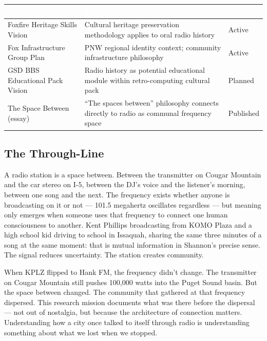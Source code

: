 \documentclass[11pt,letterpaper]{article}
\newcommand{\tableheader}[1]{\textbf{\sffamily\textcolor{white}{#1}}}
\begin{document}
\begin{center}
\begin{tabularx}{\textwidth}{L{4cm}XC{2.5cm}}
\toprule
{}
\tableheader{Document} & \tableheader{Relationship} & \tableheader{Status} \\
\midrule
Foxfire Heritage Skills Vision & Cultural heritage preservation methodology applies to oral radio history & Active \\
Fox Infrastructure Group Plan & PNW regional identity context; community infrastructure philosophy & Active \\
GSD BBS Educational Pack Vision & Radio history as potential educational module within retro-computing cultural pack & Planned \\
The Space Between (essay) & ``The spaces between'' philosophy connects directly to radio as communal frequency space & Published \\
\bottomrule
\end{tabularx}
\end{center}

\subsection{The Through-Line}

A radio station is a space between. Between the transmitter on Cougar Mountain and the car stereo on I-5, between the DJ's voice and the listener's morning, between one song and the next. The frequency exists whether anyone is broadcasting on it or not --- 101.5 megahertz oscillates regardless --- but meaning only emerges when someone uses that frequency to connect one human consciousness to another. Kent Phillips broadcasting from KOMO Plaza and a high school kid driving to school in Issaquah, sharing the same three minutes of a song at the same moment: that is mutual information in Shannon's precise sense. The signal reduces uncertainty. The station creates community.

When KPLZ flipped to Hank FM, the frequency didn't change. The transmitter on Cougar Mountain still pushes 100,000 watts into the Puget Sound basin. But the space between changed. The community that gathered at that frequency dispersed. This research mission documents what was there before the dispersal --- not out of nostalgia, but because the architecture of connection matters. Understanding how a city once talked to itself through radio is understanding something about what we lost when we stopped.
\end{document}
